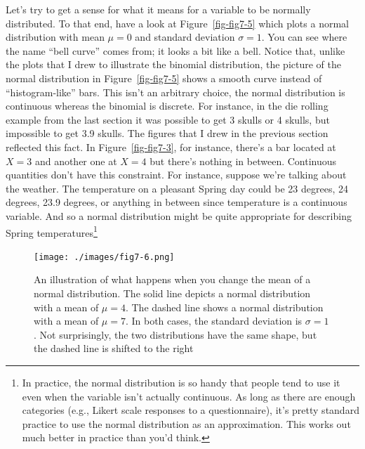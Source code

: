 \documentclass[
  letterpaper,
]{book}
\begin{document}
Let's try to get a sense for what it means for a variable to be normally
distributed. To that end, have a look at Figure~\ref{fig-fig7-5} which
plots a normal distribution with mean \(\mu = 0\) and standard deviation
\(\sigma = 1\). You can see where the name ``bell curve'' comes from; it
looks a bit like a bell. Notice that, unlike the plots that I drew to
illustrate the binomial distribution, the picture of the normal
distribution in Figure~\ref{fig-fig7-5} shows a smooth curve instead of
``histogram-like'' bars. This isn't an arbitrary choice, the normal
distribution is continuous whereas the binomial is discrete. For
instance, in the die rolling example from the last section it was
possible to get 3 skulls or 4 skulls, but impossible to get 3.9 skulls.
The figures that I drew in the previous section reflected this fact. In
Figure~\ref{fig-fig7-3}, for instance, there's a bar located at
\(X = 3\) and another one at \(X = 4\) but there's nothing in between.
Continuous quantities don't have this constraint. For instance, suppose
we're talking about the weather. The temperature on a pleasant Spring
day could be 23 degrees, 24 degrees, 23.9 degrees, or anything in
between since temperature is a continuous variable. And so a normal
distribution might be quite appropriate for describing Spring
temperatures\footnote{In practice, the normal distribution is so handy
  that people tend to use it even when the variable isn't actually
  continuous. As long as there are enough categories (e.g., Likert scale
  responses to a questionnaire), it's pretty standard practice to use
  the normal distribution as an approximation. This works out much
  better in practice than you'd think.}

\begin{figure}

\texttt{[image: ./images/fig7-6.png]} \hfill{}

\caption{\label{fig-fig7-6}An illustration of what happens when you
change the mean of a normal distribution. The solid line depicts a
normal distribution with a mean of \(\mu = 4\). The dashed line shows a
normal distribution with a mean of \(\mu = 7\). In both cases, the
standard deviation is \(\sigma = 1\). Not surprisingly, the two
distributions have the same shape, but the dashed line is shifted to the
right}

\end{figure}
\end{document}

